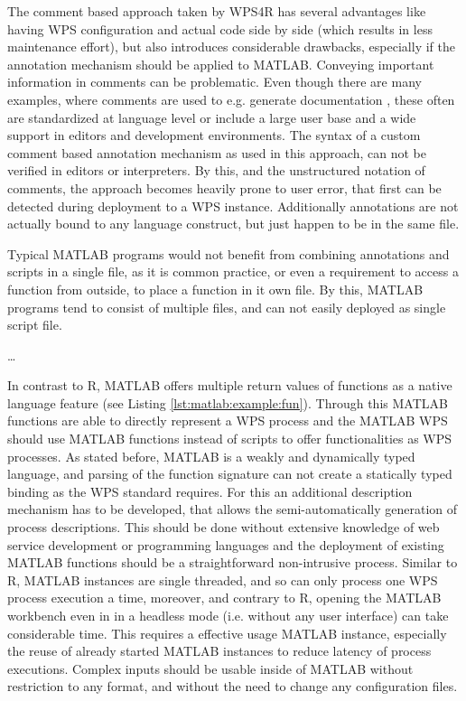 	The comment based approach taken by WPS4R has several advantages like having \ac{WPS} configuration and actual code side by side (which results in less maintenance effort), but also introduces considerable drawbacks, especially if the annotation mechanism should be applied to MATLAB. Conveying important information in comments can be problematic. Even though there are many examples, where comments are used to e.g. generate documentation \citep[e.g Javadoc,][]{javadoc}, these often are standardized at language level or include a large user base and a wide support in editors and development environments. The syntax of a custom comment based annotation mechanism as used in this approach, can not be verified in editors or interpreters. By this, and the unstructured notation of comments, the approach becomes heavily prone to user error, that first can be detected during deployment to a WPS instance. Additionally annotations are not actually bound to any language construct, but just happen to be in the same file.

	Typical MATLAB programs would not benefit from combining annotations and scripts in a single file, as it is common practice, or even a requirement to access a function from outside, to place a function in it own file. By this, MATLAB programs tend to consist of multiple files, and can not easily deployed as single script file.

	\dots

	In contrast to R, MATLAB offers multiple return values of functions as a native language feature (see Listing \ref{lst:matlab:example:fun}). Through this MATLAB functions are able to directly represent a \ac{WPS} process and the MATLAB WPS should use MATLAB functions instead of scripts to offer functionalities as WPS processes. As stated before, MATLAB is a weakly and dynamically typed language, and parsing of the function signature can not create a statically typed binding as the \ac{WPS} standard requires. For this an additional description mechanism has to be developed, that allows the semi-automatically generation of process descriptions. This should be done without extensive knowledge of web service development or programming languages and the deployment of existing MATLAB functions should be a straightforward non-intrusive process. Similar to R, MATLAB instances are single threaded, and so can only process one WPS process execution a time, moreover, and contrary to R, opening the MATLAB workbench even in in a headless mode (i.e. without any user interface) can take considerable time. This requires a effective usage MATLAB instance, especially the reuse of already started MATLAB instances to reduce latency of process executions. Complex inputs should be usable inside of MATLAB without restriction to any format, and without the need to change any configuration files.

